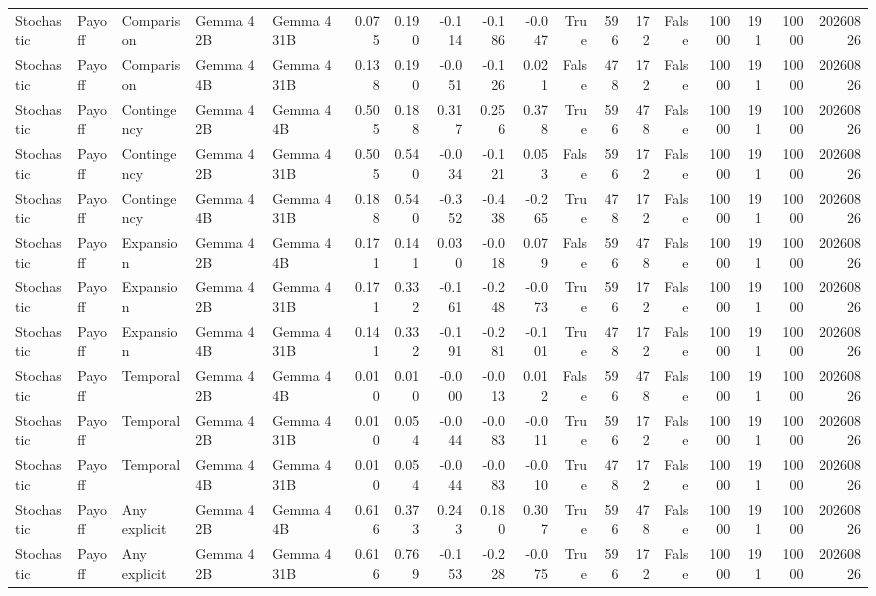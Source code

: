 \begin{tabular}{lllllrrrrrrrrrrrrr}
Stochastic & Payoff & Comparison & Gemma 4 2B & Gemma 4 31B & 0.075 & 0.190 & -0.114 & -0.186 & -0.047 & True & 596 & 172 & False & 10000 & 191 & 10000 & 20260826 \\
Stochastic & Payoff & Comparison & Gemma 4 4B & Gemma 4 31B & 0.138 & 0.190 & -0.051 & -0.126 & 0.021 & False & 478 & 172 & False & 10000 & 191 & 10000 & 20260826 \\
Stochastic & Payoff & Contingency & Gemma 4 2B & Gemma 4 4B & 0.505 & 0.188 & 0.317 & 0.256 & 0.378 & True & 596 & 478 & False & 10000 & 191 & 10000 & 20260826 \\
Stochastic & Payoff & Contingency & Gemma 4 2B & Gemma 4 31B & 0.505 & 0.540 & -0.034 & -0.121 & 0.053 & False & 596 & 172 & False & 10000 & 191 & 10000 & 20260826 \\
Stochastic & Payoff & Contingency & Gemma 4 4B & Gemma 4 31B & 0.188 & 0.540 & -0.352 & -0.438 & -0.265 & True & 478 & 172 & False & 10000 & 191 & 10000 & 20260826 \\
Stochastic & Payoff & Expansion & Gemma 4 2B & Gemma 4 4B & 0.171 & 0.141 & 0.030 & -0.018 & 0.079 & False & 596 & 478 & False & 10000 & 191 & 10000 & 20260826 \\
Stochastic & Payoff & Expansion & Gemma 4 2B & Gemma 4 31B & 0.171 & 0.332 & -0.161 & -0.248 & -0.073 & True & 596 & 172 & False & 10000 & 191 & 10000 & 20260826 \\
Stochastic & Payoff & Expansion & Gemma 4 4B & Gemma 4 31B & 0.141 & 0.332 & -0.191 & -0.281 & -0.101 & True & 478 & 172 & False & 10000 & 191 & 10000 & 20260826 \\
Stochastic & Payoff & Temporal & Gemma 4 2B & Gemma 4 4B & 0.010 & 0.010 & -0.000 & -0.013 & 0.012 & False & 596 & 478 & False & 10000 & 191 & 10000 & 20260826 \\
Stochastic & Payoff & Temporal & Gemma 4 2B & Gemma 4 31B & 0.010 & 0.054 & -0.044 & -0.083 & -0.011 & True & 596 & 172 & False & 10000 & 191 & 10000 & 20260826 \\
Stochastic & Payoff & Temporal & Gemma 4 4B & Gemma 4 31B & 0.010 & 0.054 & -0.044 & -0.083 & -0.010 & True & 478 & 172 & False & 10000 & 191 & 10000 & 20260826 \\
Stochastic & Payoff & Any explicit & Gemma 4 2B & Gemma 4 4B & 0.616 & 0.373 & 0.243 & 0.180 & 0.307 & True & 596 & 478 & False & 10000 & 191 & 10000 & 20260826 \\
Stochastic & Payoff & Any explicit & Gemma 4 2B & Gemma 4 31B & 0.616 & 0.769 & -0.153 & -0.228 & -0.075 & True & 596 & 172 & False & 10000 & 191 & 10000 & 20260826 \\

\end{tabular}
